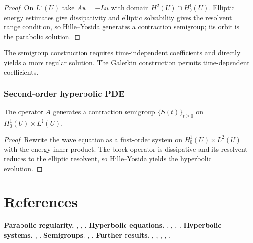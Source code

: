 \begin{proof}
\sketch On $L^2(U)$ take $Au=-Lu$ with domain $H^2(U)\cap H_0^1(U)$. Elliptic energy estimates give dissipativity and elliptic solvability gives the resolvent range condition, so Hille--Yosida generates a contraction semigroup; its orbit is the parabolic solution.
\end{proof}

\begin{remark}
\label{rem:parabolic-semigroup-remark}
The semigroup construction requires time-independent coefficients and directly yields a more regular solution. The Galerkin construction permits time-dependent coefficients.
\end{remark}

\subsubsection{Second-order hyperbolic PDE}

\begin{theorem}
\label{thm:hyperbolic-pde-as-semigroup}
The operator $A$ generates a contraction semigroup $\{S(t)\}_{t \geq 0}$ on $H_0^1(U) \times L^2(U)$.
\end{theorem}

\begin{proof}
\sketch Rewrite the wave equation as a first-order system on $H_0^1(U)\times L^2(U)$ with the energy inner product. The block operator is dissipative and its resolvent reduces to the elliptic resolvent, so Hille--Yosida yields the hyperbolic evolution.
\end{proof}

\section{References}
\label{sec:chapter7-references}
\textbf{Parabolic regularity.} \cite{Krylov1996}, \cite{LadyzhenskayaSolonnikovUraltseva1968}, \cite{Lieberman1996}.
\textbf{Hyperbolic equations.} \cite{Ladyzhenskaya1985}, \cite{Lions1961}, \cite{LionsMagenes1972}, \cite{Wloka1987}.
\textbf{Hyperbolic systems.} \cite{John1982}, \cite{Treves1975}.
\textbf{Semigroups.} \cite{Friedman1969}, \cite{Yosida1980}.
\textbf{Further results.} \cite{BrezisEvans1979}, \cite{LadyzhenskayaUraltseva1968}, \cite{Lieberman1996}, \cite{Friedman1969}, \cite{Yosida1980}.
